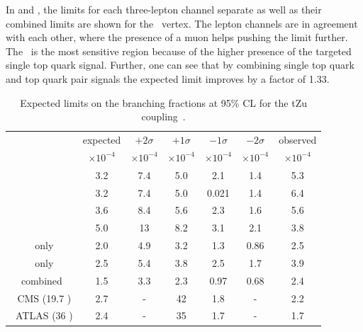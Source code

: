 In  and , the limits for each three-lepton channel separate as well as their combined limits are shown for the \Zut\ vertex. The lepton channels are in agreement with each other, where the presence of a muon helps pushing the limit further. The \STSR\ is the most sensitive region because of the higher presence of the targeted single top quark signal. Further, one can see that by combining single top quark and top quark pair signals the expected limit improves by a factor of 1.33.
\begin{table}[htbp]
	\centering
	\caption{Expected limits on the branching fractions at 95\% CL for the tZu coupling~\cite{Sirunyan:2017kkr,ATLAS-CONF-2017-070}.}
	\begin{tabular}{ccccccc}
		\toprule
		& expected & $+2\sigma$ & $+1\sigma$ & $-1\sigma$ & $-2\sigma$ & observed \\ 
		& $\times 10^{-4}$ & $\times 10^{-4}$ & $\times 10^{-4}$ & $\times 10^{-4}$ & $\times 10^{-4}$ & $\times 10^{-4}$ \\
		\midrule
		\mumumu\ &3.2  & 7.4  & 5.0  & 2.1  &1.4  & 5.3  \\ 
	
		\emumu\ & 3.2  & 7.4  & 5.0  & 0.021  & 1.4  & 6.4  \\ 
		
		\eemu\ & 3.6  & 8.4  & 5.6  & 2.3  & 1.6  & 5.6  \\ 
		
		\eee\ & 5.0  & 13  & 8.2  &3.1  & 2.1  & 3.8  \B \\ 
		\hdashline
		\STSR\ only &2.0  & 4.9  & 3.2  & 1.3  & 0.86  & 2.5   \T\\ 
		
		\TTSR\ only & 2.5  & 5.4  & 3.8  & 2.5  & 1.7  & 3.9  \B \\ 
		\hdashline
		combined & 1.5  & 3.3  & 2.3  & 0.97  & 0.68  & 2.4   \T \B\\ 
		\hdashline
		8 \TeV\ CMS (19.7 \fbinv)   &2.7  & -   & 42  & 1.8  & -  & 2.2   \T\B\\
		\hdashline
		13 \TeV\ ATLAS (36 \fbinv)   & 2.4  & -  &   35  &1.7 & -  & 1.7  \T\\
		
		\bottomrule
	\end{tabular} 
	\label{tab:ResultsTZU}
\end{table}
